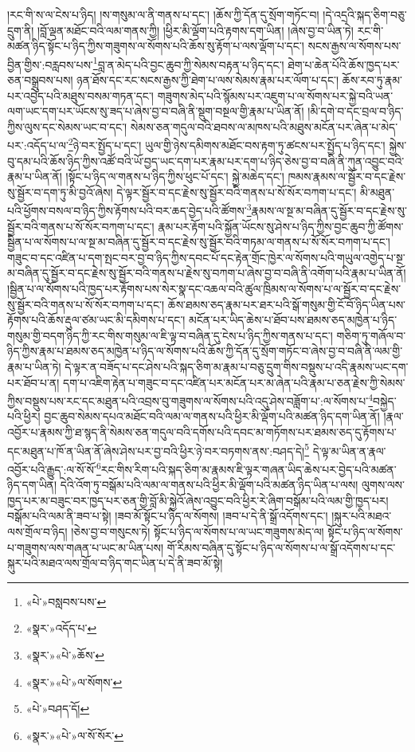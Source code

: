།རང་གི་ས་ལ་ངེས་པ་ཉིད། །ས་གསུམ་ལ་ནི་གནས་པ་དང་། །ཆོས་ཀྱི་དོན་དུ་སྲོག་གཏོང་བ། །དེ་འདྲའི་སྐད་ཅིག་བཅུ་དྲུག་ནི། །བློ་ལྡན་མཐོང་བའི་ལམ་གནས་ཀྱི། །ཕྱིར་མི་ལྡོག་པའི་རྟགས་དག་ཡིན། །ཞེས་བྱ་བ་ཡིན་ཏེ། རང་གི་མཚན་ཉིད་སྟོང་པ་ཉིད་ཀྱིས་གཟུགས་ལ་སོགས་པའི་ཆོས་སུ་རྟོག་པ་ལས་ལྡོག་པ་དང་། སངས་རྒྱས་ལ་སོགས་པས་བྱིན་གྱིས་:བརླབས་པས་\footnote{«པེ་»བསླབས་པས་}བླ་ན་མེད་པའི་བྱང་ཆུབ་ཀྱི་སེམས་བརྟན་པ་ཉིད་དང་། ཐེག་པ་ཆེན་པོའི་ཆོས་ཁྱད་པར་ཅན་བསྒྲུབས་པས། ཉན་ཐོས་དང་རང་སངས་རྒྱས་ཀྱི་ཐེག་པ་ལས་སེམས་རྣམ་པར་ལོག་པ་དང་། ཆོས་རབ་ཏུ་རྣམ་པར་འབྱེད་པའི་མཐུས་བསམ་གཏན་དང་། གཟུགས་མེད་པའི་སྙོམས་པར་འཇུག་པ་ལ་སོགས་པར་སྐྱེ་བའི་ཡན་ལག་ཡང་དག་པར་ཡོངས་སུ་ཟད་པ་ཞེས་བྱ་བ་བཞི་ནི་སྡུག་བསྔལ་གྱི་རྣམ་པ་ཡིན་ནོ། །མི་དགེ་བ་དང་བྲལ་བ་ཉིད་ཀྱིས་ལུས་དང་སེམས་ཡང་བ་དང་། སེམས་ཅན་གདུལ་བའི་ཐབས་ལ་མཁས་པའི་མཐུས་མངོན་པར་ཞེན་པ་མེད་པར་:འདོད་པ་ལ་\footnote{«སྣར་»འདོད་པ་}ཉེ་བར་སྤྱོད་པ་དང་། ཡུལ་གྱི་ཉེས་དམིགས་མཐོང་བས་རྟག་ཏུ་ཚངས་པར་སྤྱོད་པ་ཉིད་དང་། སྐྱེས་བུ་དམ་པའི་ཆོས་ཉིད་ཀྱིས་འཚོ་བའི་ཡོ་བྱད་ཡང་དག་པར་རྣམ་པར་དག་པ་ཉིད་ཅེས་བྱ་བ་བཞི་ནི་ཀུན་འབྱུང་བའི་རྣམ་པ་ཡིན་ནོ། །སྟོང་པ་ཉིད་ལ་གནས་པ་ཉིད་ཀྱིས་ཕུང་པོ་དང་། སྐྱེ་མཆེད་དང་། ཁམས་རྣམས་ལ་སྦྱོར་བ་དང་རྗེས་སུ་སྦྱོར་བ་དག་ཏུ་མི་བྱའོ་ཞེས། དེ་ལྟར་སྦྱོར་བ་དང་རྗེས་སུ་སྦྱོར་བའི་གནས་པ་སོ་སོར་བཀག་པ་དང་། མི་མཐུན་པའི་ཕྱོགས་བསལ་བ་ཉིད་ཀྱིས་རྟོགས་པའི་བར་ཆད་བྱེད་པའི་ཚོགས་\footnote{«སྣར་»«པེ་»ཆོས་}རྣམས་ལ་སྔ་མ་བཞིན་དུ་སྦྱོར་བ་དང་རྗེས་སུ་སྦྱོར་བའི་གནས་པ་སོ་སོར་བཀག་པ་དང་། རྣམ་པར་རྟོག་པའི་སྐྱོན་ཡོངས་སུ་ཤེས་པ་ཉིད་ཀྱིས་བྱང་ཆུབ་ཀྱི་ཚོགས་སྦྱིན་པ་ལ་སོགས་པ་ལ་སྔ་མ་བཞིན་དུ་སྦྱོར་བ་དང་རྗེས་སུ་སྦྱོར་བའི་གཏམ་ལ་གནས་པ་སོ་སོར་བཀག་པ་དང་། གཟུང་བ་དང་འཛིན་པ་དག་སྤང་བར་བྱ་བ་ཉིད་ཀྱིས་དབང་པོ་དང་རྟེན་གྲོང་ཁྱེར་ལ་སོགས་པའི་གཡུལ་འགྱེད་པ་སྔ་མ་བཞིན་དུ་སྦྱོར་བ་དང་རྗེས་སུ་སྦྱོར་བའི་གནས་པ་རྗེས་སུ་བཀག་པ་ཞེས་བྱ་བ་བཞི་ནི་འགོག་པའི་རྣམ་པ་ཡིན་ནོ། །སྦྱིན་པ་ལ་སོགས་པའི་ཁྱད་པར་རྟོགས་པས་སེར་སྣ་དང་འཆལ་བའི་ཚུལ་ཁྲིམས་ལ་སོགས་པ་ལ་སྦྱོར་བ་དང་རྗེས་སུ་སྦྱོར་བའི་གནས་པ་སོ་སོར་བཀག་པ་དང་། ཆོས་ཐམས་ཅད་རྣམ་པར་ཐར་པའི་སྒོ་གསུམ་གྱི་ངོ་བོ་ཉིད་ཡིན་པས་རྟོགས་པའི་ཆོས་རྡུལ་ཙམ་ཡང་མི་དམིགས་པ་དང་། མངོན་པར་ཡིད་ཆེས་པ་ཐོབ་པས་ཐམས་ཅད་མཁྱེན་པ་ཉིད་གསུམ་གྱི་བདག་ཉིད་ཀྱི་རང་གིས་གསུམ་ལ་ཇི་ལྟ་བ་བཞིན་དུ་ངེས་པ་ཉིད་ཀྱིས་གནས་པ་དང་། གཅིག་ཏུ་གཞོལ་བ་ཉིད་ཀྱིས་རྣམ་པ་ཐམས་ཅད་མཁྱེན་པ་ཉིད་ལ་སོགས་པའི་ཆོས་ཀྱི་དོན་དུ་སྲོག་གཏོང་བ་ཞེས་བྱ་བ་བཞི་ནི་ལམ་གྱི་རྣམ་པ་ཡིན་ཏེ། དེ་ལྟར་ན་བཟོད་པ་དང་ཤེས་པའི་སྐད་ཅིག་མ་རྣམ་པ་བཅུ་དྲུག་གིས་བསྡུས་པ་འདི་རྣམས་ཡང་དག་པར་ཐོབ་པ་ན། དག་པ་འཇིག་རྟེན་པ་གཟུང་བ་དང་འཛིན་པར་མངོན་པར་མ་ཞེན་པའི་རྣམ་པ་ཅན་རྗེས་ཀྱི་སེམས་ཀྱིས་བསྡུས་པས་རང་དང་མཐུན་པའི་འབྲས་བུ་གཟུགས་ལ་སོགས་པའི་འདུ་ཤེས་བཟློག་པ་:ལ་སོགས་པ་\footnote{«སྣར་»«པེ་»ལ་སོགས་}བསྐྱེད་པའི་ཕྱིར། བྱང་ཆུབ་སེམས་དཔའ་མཐོང་བའི་ལམ་ལ་གནས་པའི་ཕྱིར་མི་ལྡོག་པའི་མཚན་ཉིད་དག་ཡིན་ནོ། །རྣལ་འབྱོར་པ་རྣམས་ཀྱི་ཐ་སྙད་ནི་སེམས་ཅན་གདུལ་བའི་དགོས་པའི་དབང་མ་གཏོགས་པར་ཐམས་ཅད་དུ་རྟོགས་པ་དང་མཐུན་པ་ཁོ་ན་ཡིན་ནོ་ཞེས་ཤེས་པར་བྱ་བའི་ཕྱིར་ཉེ་བར་བཏགས་ནས་:བཤད་དེ།\footnote{«པེ་»བཤད་དོ།} དེ་ལྟ་མ་ཡིན་ན་རྣལ་འབྱོར་པའི་རྒྱུད་:ལ་སོ་སོ་\footnote{«སྣར་»«པེ་»ལ་སོ་སོར་}རང་གིས་རིག་པའི་སྐད་ཅིག་མ་རྣམས་ཇི་ལྟར་གཞན་ཡིད་ཆེས་པར་བྱེད་པའི་མཚན་ཉིད་དག་ཡིན། དེའི་འོག་ཏུ་བསྒོམ་པའི་ལམ་ལ་གནས་པའི་ཕྱིར་མི་ལྡོག་པའི་མཚན་ཉིད་ཡིན་པ་ལས། ལུགས་ལས་ཁྱད་པར་མ་བཟུང་བར་ཁྱད་པར་ཅན་གྱི་བློ་མི་སྐྱེའོ་ཞེས་འབྱུང་བའི་ཕྱིར་རེ་ཞིག་བསྒོམ་པའི་ལམ་གྱི་ཁྱད་པར། བསྒོམ་པའི་ལམ་ནི་ཟབ་པ་སྟེ། །ཟབ་མོ་སྟོང་པ་ཉིད་ལ་སོགས། །ཟབ་པ་དེ་ནི་སྒྲོ་འདོགས་དང་། །སྐུར་པའི་མཐའ་ལས་གྲོལ་བ་ཉིད། །ཅེས་བྱ་བ་གསུངས་ཏེ། སྟོང་པ་ཉིད་ལ་སོགས་པ་ལ་ཡང་གཟུགས་མེད་ལ། སྟོང་པ་ཉིད་ལ་སོགས་པ་གཟུགས་ལས་གཞན་པ་ཡང་མ་ཡིན་པས། གོ་རིམས་བཞིན་དུ་སྟོང་པ་ཉིད་ལ་སོགས་པ་ལ་སྒྲོ་འདོགས་པ་དང་སྐུར་པའི་མཐའ་ལས་གྲོལ་བ་ཉིད་གང་ཡིན་པ་དེ་ནི་ཟབ་མོ་སྟེ། 